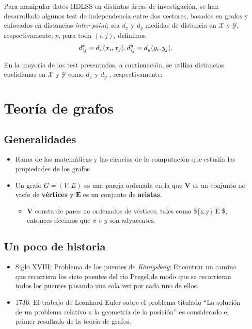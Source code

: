 \documentclass[]{book}
\providecommand{\tightlist}{%
  \setlength{\itemsep}{0pt}\setlength{\parskip}{0pt}}
\begin{document}
Para manipular datos HDLSS en distintas áreas de investigación, se han
desarrollado algunos test de independencia entre dos vectores, basados
en grafos y enfocados en distancias \emph{inter-point}; sea \(d_{x}\) y
\(d_{y}\) medidas de distancia en \(\mathcal{X}\) y \(\mathcal{Y}\),
respectivamente; y, para toda \((i,j)\), definimos
\[ d_{ij}^x = d_x(x_i, x_j), \\ d_{ij}^y = d_y(y_i, y_j). \]

En la mayoría de los test presentados, a continuación, se utiliza
distancias euclidianas en \(\mathcal{X}\) y \(\mathcal{Y}\) como
\(d_{x}\) y \(d_{y}\) , respectivamente.

\chapter{Teoría de grafos}\label{teoria-de-grafos}

\section{Generalidades}\label{generalidades}

\begin{itemize}
\tightlist
\item
  Rama de las matemáticas y las ciencias de la computación que estudia
  las propiedades de los grafos
\item
  Un grafo \(\displaystyle G=(V,E)\) es una pareja ordenada en la que
  \(\mathbf{V}\) es un conjunto no vacío de \textbf{vértices} y
  \(\mathbf{E}\) es un conjunto de \textbf{aristas}.

  \begin{itemize}
  \tightlist
  \item
    \(\mathbf{V}\) consta de pares no ordenados de vértices, tales como
    \$\{x,y\} \in E \$, entonces decimos que \(x\) e \(y\) son
    adyacentes.
  \end{itemize}
\end{itemize}

\section{Un poco de historia}\label{un-poco-de-historia}

\begin{itemize}
\item
  Siglo XVIII: Problema de los puentes de \emph{Königsberg}: Encontrar
  un camino que recorriera los siete puentes del río Pregel,de modo que
  se recorrieran todos los puentes pasando una sola vez por cada uno de
  ellos.
\item
  1736: El trabajo de Leonhard Euler sobre el problema titulado ``La
  solución de un problema relativo a la geometría de la posición'' es
  considerado el primer resultado de la teoría de
  grafos.\citep{euler1741solutio}
\end{itemize}
\end{document}
